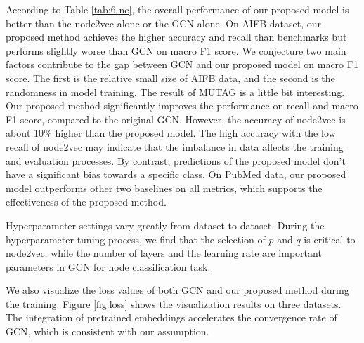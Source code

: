 \documentclass[sigconf]{acmart}
\begin{document}
According to Table \ref{tab:6-nc}, the overall performance of our proposed model is better than the node2vec alone or the GCN alone. On AIFB dataset, our proposed method achieves the higher accuracy and recall than benchmarks but performs slightly worse than GCN on macro F1 score. We conjecture two main factors contribute to the gap between GCN and our proposed model on macro F1 score. The first is the relative small size of AIFB data, and the second is the randomness in model training. The result of MUTAG is a little bit interesting. Our proposed method significantly improves the performance on recall and macro F1 score, compared to the original GCN. However, the accuracy of node2vec is about 10\% higher than the proposed model. The high accuracy with the low recall of node2vec may indicate that the imbalance in data affects the training and evaluation processes. By contrast, predictions of the proposed model don't have a significant bias towards a specific class. On PubMed data, our proposed model outperforms other two baselines on all metrics, which supports the effectiveness of the proposed method.

Hyperparameter settings vary greatly from dataset to dataset. During the hyperparameter tuning process, we find that the selection of $p$ and $q$ is critical to node2vec, while the number of layers and the learning rate are important parameters in GCN for node classification task.

We also visualize the loss values of both GCN and our proposed method during the training. Figure \ref{fig:loss} shows the visualization results on three datasets. The integration of pretrained embeddings accelerates the convergence rate of GCN, which is consistent with our assumption.
\end{document}
